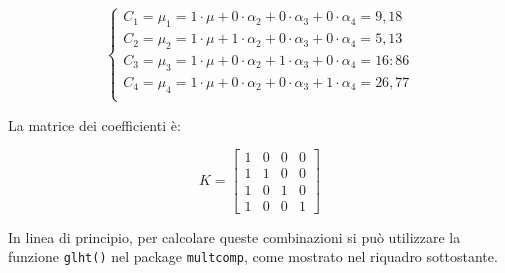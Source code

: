 \documentclass[
  12pt,
]{book}
\begin{document}
\[\left\{ {\begin{array}{l}
C_1 = \mu_1 = 1 \cdot \mu + 0 \cdot \alpha_2 + 0 \cdot\alpha_3 + 0 \cdot\alpha_4 = 9,18\\
C_2 = \mu_2 = 1 \cdot \mu + 1 \cdot \alpha_2 + 0 \cdot\alpha_3 + 0 \cdot\alpha_4 = 5,13\\
C_3 = \mu_3 = 1 \cdot \mu + 0 \cdot \alpha_2 + 1 \cdot\alpha_3 + 0 \cdot\alpha_4 = 16:86\\
C_4 = \mu_4 = 1 \cdot \mu + 0 \cdot \alpha_2 + 0 \cdot\alpha_3 + 1 \cdot\alpha_4 = 26,77\\
\end{array}} \right.\]

La matrice dei coefficienti è:

\[ K = \left[ {\begin{array}{llll}
1 & 0 & 0 & 0\\
1 & 1 & 0 & 0\\
1 & 0 & 1 & 0\\
1 & 0 & 0 & 1
\end{array}} \right]\]

In linea di principio, per calcolare queste combinazioni si può utilizzare la funzione \texttt{glht()} nel package \texttt{multcomp}, come mostrato nel riquadro sottostante.
\end{document}
